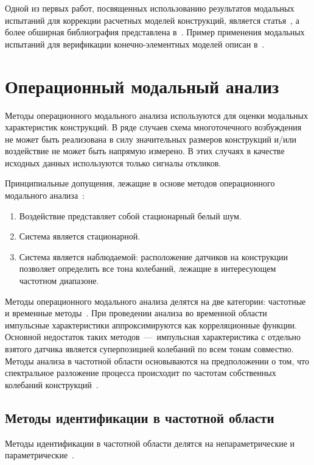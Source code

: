 Одной из первых работ, посвященных использованию результатов модальных испытаний для коррекции расчетных моделей конструкций, является статья~\cite{lib:ema:Baruch}, а более обширная библиография представлена в~\cite{lib:ema:Heilen}. Пример применения модальных испытаний для верификации конечно-элементных моделей описан в~\cite{lib:ema:Mezhin}.

\section{Операционный модальный анализ} \label{struct:reviewOMA}

Методы операционного модального анализа используются для оценки модальных характеристик конструкций. В ряде случаев схема многоточечного возбуждения не может быть реализована в силу значительных размеров конструкций и/или воздействие не может быть напрямую измерено. В этих случаях в качестве исходных данных используются только сигналы откликов. 

Принципиальные допущения, лежащие в основе методов операционного модального анализа~\cite{lib:oma:Brincker}:
\begin{enumerate}[noitemsep]
	\item Воздействие представляет собой стационарный белый шум.
	\item Система является стационарной.
	\item Система является наблюдаемой: расположение датчиков на конструкции позволяет определить все тона колебаний, лежащие в интересующем частотном диапазоне. 
\end{enumerate}

Методы операционного модального анализа делятся на две категории: частотные и временные методы~\cite{lib:oma:Magalhaes, lib:oma:Overshee}. При проведении анализа во временной области импульсные характеристики аппроксимируются как корреляционные функции. Основной недостаток таких методов~---~импульсная характеристика с отдельно взятого датчика является суперпозицией колебаний по всем тонам совместно. Методы анализа в частотной области основываются на предположении о том, что спектральное разложение процесса происходит по частотам собственных колебаний конструкций~\cite{lib:oma:Brincker}. 

\subsection{Методы идентификации в частотной области}

Методы идентификации в частотной области делятся на непараметрические и параметрические~.

